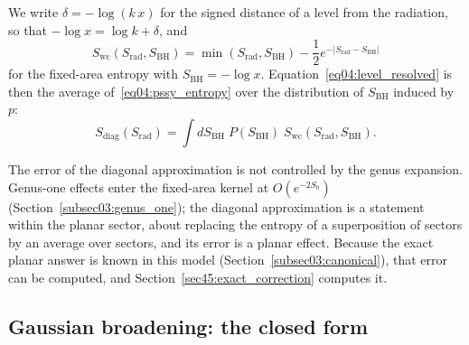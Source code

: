 \documentclass[11pt,letterpaper]{article}
\theoremstyle{plain}
\theoremstyle{definition}
\theoremstyle{remark}
\begin{document}
We write $\delta = -\log(k\,x)$ for the signed distance of a level from the radiation, so that $-\log x = \log k + \delta$, and
\begin{equation}
\label{eq04:pssy_entropy}
S_{\mathrm{wc}}(S_{\mathrm{rad}}, S_{\mathrm{BH}}) = \min(S_{\mathrm{rad}}, S_{\mathrm{BH}}) - \frac{1}{2} e^{-|S_{\mathrm{rad}} - S_{\mathrm{BH}}|}
\end{equation}
for the fixed-area entropy with $S_{\mathrm{BH}} = -\log x$. Equation~\eqref{eq04:level_resolved} is then the average of~\eqref{eq04:pssy_entropy} over the distribution of $S_{\mathrm{BH}}$ induced by $p$:
\begin{equation}
\label{eq04:convolution}
S_{\mathrm{diag}}(S_{\mathrm{rad}}) = \int dS_{\mathrm{BH}}\; P(S_{\mathrm{BH}})\; S_{\mathrm{wc}}(S_{\mathrm{rad}}, S_{\mathrm{BH}}) .
\end{equation}

The error of the diagonal approximation is not controlled by the genus expansion. Genus-one effects enter the fixed-area kernel at $O(e^{-2S_0})$ (Section~\ref{subsec03:genus_one}); the diagonal approximation is a statement within the planar sector, about replacing the entropy of a superposition of sectors by an average over sectors, and its error is a planar effect. Because the exact planar answer is known in this model (Section~\ref{subsec03:canonical}), that error can be computed, and Section~\ref{sec45:exact_correction} computes it.

\subsection{Gaussian broadening: the closed form}
\label{subsec04:gaussian_broadening}
\end{document}
